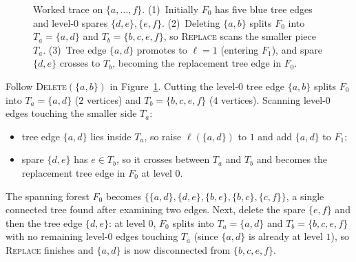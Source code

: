 \begin{figure}[htbp]
\caption{Worked trace on $\{a,\dots,f\}$. (1)~Initially $F_0$ has five blue tree edges and level-$0$ spares $\{d,e\},\{e,f\}$. (2)~Deleting $\{a,b\}$ splits $F_0$ into $T_a=\{a,d\}$ and $T_b=\{b,c,e,f\}$, so \textsc{Replace} scans the smaller piece $T_a$. (3)~Tree edge $\{a,d\}$ promotes to $\ell=1$ (entering $F_1$), and spare $\{d,e\}$ crosses to $T_b$, becoming the replacement tree edge in $F_0$.}
\label{ch39:fig-hdlt}
\end{figure}

\begin{labbox}
Follow \textsc{Delete}$(\{a,b\})$ in Figure~\ref{ch39:fig-hdlt}. Cutting the level-$0$
tree edge $\{a,b\}$ splits $F_0$ into $T_a=\{a,d\}$ ($2$ vertices) and
$T_b=\{b,c,e,f\}$ ($4$ vertices). Scanning level-$0$ edges touching the smaller side
$T_a$:
\begin{itemize}
  \item tree edge $\{a,d\}$ lies inside $T_a$, so raise $\ell(\{a,d\})$ to $1$ and add
        $\{a,d\}$ to $F_1$;
  \item spare $\{d,e\}$ has $e\in T_b$, so it crosses between $T_a$ and $T_b$ and
        becomes the replacement tree edge in $F_0$ at level $0$.
\end{itemize}
The spanning forest $F_0$ becomes $\{\{a,d\},\{d,e\},\{b,e\},\{b,c\},\{c,f\}\}$, a
single connected tree found after examining two edges. Next, delete the spare $\{e,f\}$
and then the tree edge $\{d,e\}$: at level $0$, $F_0$ splits into $T_a=\{a,d\}$ and
$T_b=\{b,c,e,f\}$ with no remaining level-$0$ edges touching $T_a$ (since $\{a,d\}$ is
already at level $1$), so \textsc{Replace} finishes and $\{a,d\}$ is now disconnected
from $\{b,c,e,f\}$.
\end{labbox}

